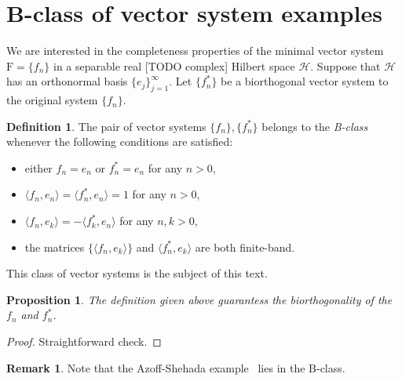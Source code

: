 \documentclass[12pt]{article}
\newcommand\inner[2]{\langle #1, #2 \rangle}
\renewcommand{\cal}[1]{\mathcal{#1}}
\newtheorem{prop}{Proposition}
\theoremstyle{definition}
\newtheorem{remark}{Remark}
\newtheorem{definition}{Definition}
\newcommand{\fsys}{\mathrm{F}}
\numberwithin{remark}{section}
\numberwithin{theorem}{section}
\numberwithin{prop}{section}
\numberwithin{equation}{section}
\numberwithin{lemma}{section}
\numberwithin{prop_under_lemma}{lemma}
\begin{document}


\section{B-class of vector system examples}
    We are interested in the completeness properties of the minimal vector system $\fsys = \{f_n\}$ in a separable real [TODO complex] Hilbert space $\cal{H}$.
    Suppose that $\cal{H}$ has an orthonormal basis $\{e_j\}_{j=1}^\infty$.
    Let $\{f^*_n\}$ be a biorthogonal vector system to the original system $\{f_n\}$.
    \begin{definition}
        The pair of vector systems $\{f_n\}, \{f^*_n\}$ belongs to the \textit{B-class} whenever the following conditions are satisfied:
        \begin{itemize}
            \item either $f_n = e_n$ or $f^*_n = e_n$ for any $n > 0$,
            \item $\langle f_n, e_n\rangle = \langle f^*_n, e_n \rangle = 1$ for any $n > 0$,
            \item $\langle f_n, e_k \rangle = -\langle f^*_k, e_n \rangle$ for any $n, k > 0$,
            \item the matrices $\{\langle f_n, e_k\rangle\}$ and $\inner{f^*_n}{e_k}$ are both finite-band.
        \end{itemize}
    \end{definition}
    This class of vector systems is the subject of this text.
    \begin{prop}
        The definition given above guarantess the biorthogonality of the $f_n$ and $f^*_n$.
    \end{prop}
    \begin{proof}
        Straightforward check.
    \end{proof}
    \begin{remark}
        Note that the Azoff-Shehada example~\cite{azoff} lies in the B-class.
    \end{remark}
    
\end{document}
